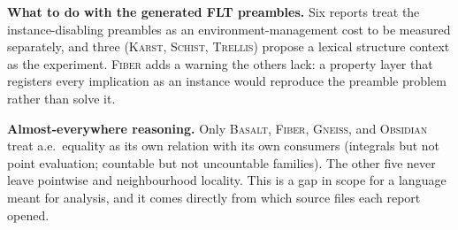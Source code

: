 \documentclass[11pt,a4paper]{article}
\newcommand{\Bs}{\textsc{Basalt}}
\newcommand{\Fb}{\textsc{Fiber}}
\newcommand{\Gn}{\textsc{Gneiss}}
\newcommand{\Ks}{\textsc{Karst}}
\newcommand{\Ob}{\textsc{Obsidian}}
\newcommand{\Sc}{\textsc{Schist}}
\newcommand{\Tr}{\textsc{Trellis}}
\theoremstyle{definition}
\begin{document}
\textbf{What to do with the generated FLT preambles.} Six reports treat the instance-disabling preambles as an environment-management cost to be measured separately, and three (\Ks, \Sc, \Tr) propose a lexical structure context as the experiment. \Fb{} adds a warning the others lack: a property layer that registers every implication as an instance would reproduce the preamble problem rather than solve it.

\textbf{Almost-everywhere reasoning.} Only \Bs, \Fb, \Gn, and \Ob{} treat a.e.\ equality as its own relation with its own consumers (integrals but not point evaluation; countable but not uncountable families). The other five never leave pointwise and neighbourhood locality. This is a gap in scope for a language meant for analysis, and it comes directly from which source files each report opened.
\end{document}
